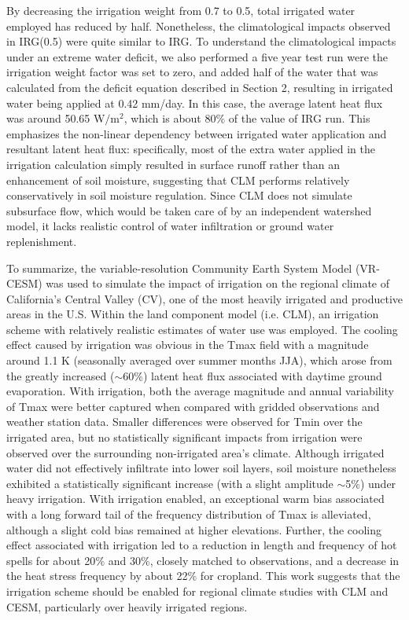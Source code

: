 \documentclass[draft,ms]{agutex}   %
\begin{document}
\begin{article}
By decreasing the irrigation weight from 0.7 to 0.5, total irrigated water employed has reduced by half. Nonetheless, the climatological impacts observed in IRG(0.5) were quite similar to IRG. To understand the climatological impacts under an extreme water deficit, we also performed a five year test run were the irrigation weight factor was set to zero, and added half of the water that was calculated from the deficit equation described in Section 2, resulting in irrigated water being applied at 0.42 mm/day. In this case, the average latent heat flux was around 50.65 W$/$m$^2$, which is about 80$\%$ of the value of IRG run.  This emphasizes the non-linear dependency between irrigated water application and resultant latent heat flux: specifically, most of the extra water applied in the irrigation calculation simply resulted in surface runoff rather than an enhancement of soil moisture, suggesting that CLM performs relatively conservatively in soil moisture regulation. Since CLM does not simulate subsurface flow, which would be taken care of by an independent watershed model, it lacks realistic control of water infiltration or ground water replenishment.

To summarize, the variable-resolution Community Earth System Model (VR-CESM) was used to simulate the impact of irrigation on the regional climate of California's Central Valley (CV), one of the most heavily irrigated and productive areas in the U.S. Within the land component model (i.e. CLM), an irrigation scheme with relatively realistic estimates of water use was employed. The cooling effect caused by irrigation was obvious in the Tmax field with a magnitude around 1.1 K (seasonally averaged over summer months JJA), which arose from the greatly increased ($\sim$60$\%$) latent heat flux associated with daytime ground evaporation. With irrigation, both the average magnitude and annual variability of Tmax were better captured when compared with gridded observations and weather station data. Smaller differences were observed for Tmin over the irrigated area, but no statistically significant impacts from irrigation were observed over the surrounding non-irrigated area's climate. Although irrigated water did not effectively infiltrate into lower soil layers, soil moisture nonetheless exhibited a statistically significant increase (with a slight amplitude $\sim$5$\%$) under heavy irrigation. With irrigation enabled, an exceptional warm bias associated with a long forward tail of the frequency distribution of Tmax is alleviated, although a slight cold bias remained at higher elevations. Further, the cooling effect associated with irrigation led to a reduction in length and frequency of hot spells for about 20$\%$ and 30$\%$, closely matched to observations, and a decrease in the heat stress frequency by about 22$\%$ for cropland. This work suggests that the irrigation scheme should be enabled for regional climate studies with CLM and CESM, particularly over heavily irrigated regions.


\end{article}
\end{document}
